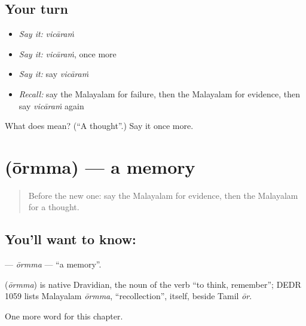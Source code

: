 \subsection*{Your turn}
\begin{itemize}
\raggedright
  \item \emph{Say it:} \emph{vicāraṁ}
  \item \emph{Say it:} \emph{vicāraṁ}, once more
  \item \emph{Say it:} say \emph{vicāraṁ}
  \item \emph{Recall:} say the Malayalam for failure, then the Malayalam for evidence, then say \emph{vicāraṁ} again
\end{itemize}

\begin{tcolorbox}[breakable,colback=teal!4,colframe=teal!35!black,title={Before you move on}]
What does  mean? (\textquotedblleft{}A thought\textquotedblright{}.) Say it once more.
\end{tcolorbox}
\section[\texorpdfstring{\ml{ഓർമ്മ} (ōrmma)}{ഓർമ്മ (ōrmma)}]{ (ōrmma) — a memory}

\label{lesson:ML-C318-ormma}



\begin{quote}
Before the new one: say the Malayalam for evidence, then the Malayalam for a thought.
\end{quote}

\subsection*{You'll want to know: }
\textbf{} — \emph{ōrmma} — \textquotedblleft{}a memory\textquotedblright{}.

\begin{cousinweb}
\textbf{} (\emph{ōrmma}) is native Dravidian, the noun of the verb \textquotedblleft{}to think, remember\textquotedblright{}; DEDR 1059 lists Malayalam \emph{ōrmma}, \textquotedblleft{}recollection\textquotedblright{}, itself, beside Tamil \emph{ōr}.
\end{cousinweb}

\begin{grammarlens}[title={What you've built}]
One more word for this chapter.
\end{grammarlens}

